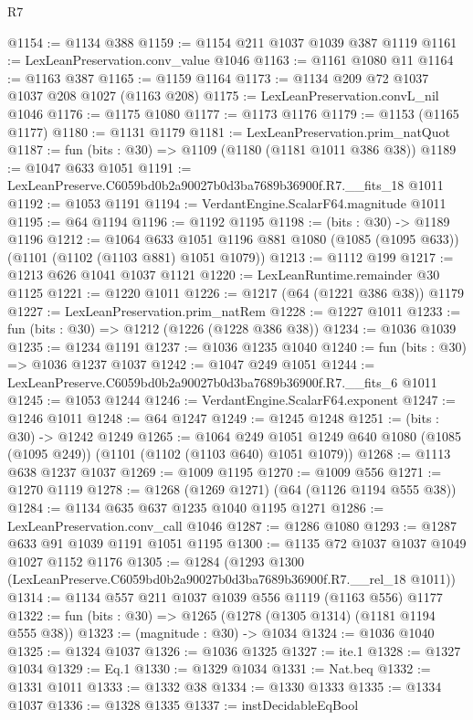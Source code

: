 \begin{lexlean}{R7}
\begin{coremodule}
@1154 := @1134 @388
@1159 := @1154 @211 @1037 @1039 @387 @1119
@1161 := LexLeanPreservation.conv_value @1046
@1163 := @1161 @1080 @11
@1164 := @1163 @387
@1165 := @1159 @1164
@1173 := @1134 @209 @72 @1037 @1037 @208 @1027 (@1163 @208)
@1175 := LexLeanPreservation.convL_nil @1046
@1176 := @1175 @1080
@1177 := @1173 @1176
@1179 := @1153 (@1165 @1177)
@1180 := @1131 @1179
@1181 := LexLeanPreservation.prim_natQuot
@1187 := fun (bits : @30) => @1109 (@1180 (@1181 @1011 @386 @38))
@1189 := @1047 @633 @1051
@1191 := LexLeanPreserve.C6059bd0b2a90027b0d3ba7689b36900f.R7.__fits_18 @1011
@1192 := @1053 @1191
@1194 := VerdantEngine.ScalarF64.magnitude @1011
@1195 := @64 @1194
@1196 := @1192 @1195
@1198 := (bits : @30) -> @1189 @1196
@1212 := @1064
    @633
    @1051
    @1196
    @881
    @1080
    (@1085 (@1095 @633))
    (@1101 (@1102 (@1103 @881) @1051 @1079))
@1213 := @1112 @199
@1217 := @1213 @626 @1041 @1037 @1121
@1220 := LexLeanRuntime.remainder @30 @1125
@1221 := @1220 @1011
@1226 := @1217 (@64 (@1221 @386 @38)) @1179
@1227 := LexLeanPreservation.prim_natRem
@1228 := @1227 @1011
@1233 := fun (bits : @30) => @1212 (@1226 (@1228 @386 @38))
@1234 := @1036 @1039
@1235 := @1234 @1191
@1237 := @1036 @1235 @1040
@1240 := fun (bits : @30) => @1036 @1237 @1037
@1242 := @1047 @249 @1051
@1244 := LexLeanPreserve.C6059bd0b2a90027b0d3ba7689b36900f.R7.__fits_6 @1011
@1245 := @1053 @1244
@1246 := VerdantEngine.ScalarF64.exponent
@1247 := @1246 @1011
@1248 := @64 @1247
@1249 := @1245 @1248
@1251 := (bits : @30) -> @1242 @1249
@1265 := @1064
    @249
    @1051
    @1249
    @640
    @1080
    (@1085 (@1095 @249))
    (@1101 (@1102 (@1103 @640) @1051 @1079))
@1268 := @1113 @638 @1237 @1037
@1269 := @1009 @1195
@1270 := @1009 @556
@1271 := @1270 @1119
@1278 := @1268 (@1269 @1271) (@64 (@1126 @1194 @555 @38))
@1284 := @1134 @635 @637 @1235 @1040 @1195 @1271
@1286 := LexLeanPreservation.conv_call @1046
@1287 := @1286 @1080
@1293 := @1287 @633 @91 @1039 @1191 @1051 @1195
@1300 := @1135 @72 @1037 @1037 @1049 @1027 @1152 @1176
@1305 := @1284 (@1293 @1300 (LexLeanPreserve.C6059bd0b2a90027b0d3ba7689b36900f.R7.__rel_18 @1011))
@1314 := @1134 @557 @211 @1037 @1039 @556 @1119 (@1163 @556) @1177
@1322 := fun (bits : @30) => @1265 (@1278 (@1305 @1314) (@1181 @1194 @555 @38))
@1323 := (magnitude : @30) -> @1034
@1324 := @1036 @1040
@1325 := @1324 @1037
@1326 := @1036 @1325
@1327 := ite.{1}
@1328 := @1327 @1034
@1329 := Eq.{1}
@1330 := @1329 @1034
@1331 := Nat.beq
@1332 := @1331 @1011
@1333 := @1332 @38
@1334 := @1330 @1333
@1335 := @1334 @1037
@1336 := @1328 @1335
@1337 := instDecidableEqBool

\end{coremodule}
\end{lexlean}
